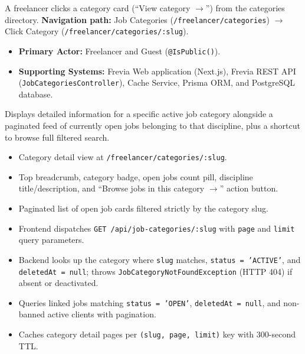 A freelancer clicks a category card (``View category $\rightarrow$'') from the categories directory.\newline
\textbf{Navigation path:} Job Categories (\texttt{/freelancer/categories}) $\rightarrow$ Click Category (\texttt{/freelancer/categories/:slug}).


\begin{itemize}[leftmargin=1.6em,topsep=3pt,itemsep=2pt,parsep=0pt,label=$\bullet$]
    \item \textbf{Primary Actor:} Freelancer and Guest (\texttt{@IsPublic()}).
    \item \textbf{Supporting Systems:} Frevia Web application (Next.js), Frevia REST API (\texttt{JobCategoriesController}), Cache Service, Prisma ORM, and PostgreSQL database.
\end{itemize}

\noindent Displays detailed information for a specific active job category alongside a paginated feed of currently open jobs belonging to that discipline, plus a shortcut to browse full filtered search.

\begin{itemize}[leftmargin=1.6em,topsep=3pt,itemsep=2pt,parsep=0pt,label=$\bullet$]
    \item Category detail view at \texttt{/freelancer/categories/:slug}.
    \item Top breadcrumb, category badge, open jobs count pill, discipline title/description, and ``Browse jobs in this category $\rightarrow$'' action button.
    \item Paginated list of open job cards filtered strictly by the category slug.
\end{itemize}

\begin{itemize}[leftmargin=1.6em,topsep=3pt,itemsep=2pt,parsep=0pt,label=$\bullet$]
    \item Frontend dispatches \texttt{GET /api/job-categories/:slug} with \texttt{page} and \texttt{limit} query parameters.
    \item Backend looks up the category where \texttt{slug} matches, \texttt{status = 'ACTIVE'}, and \texttt{deletedAt = null}; throws \texttt{JobCategoryNotFoundException} (HTTP 404) if absent or deactivated.
    \item Queries linked jobs matching \texttt{status = 'OPEN'}, \texttt{deletedAt = null}, and non-banned active clients with pagination.
    \item Caches category detail pages per \texttt{(slug, page, limit)} key with 300-second TTL.
\end{itemize}

